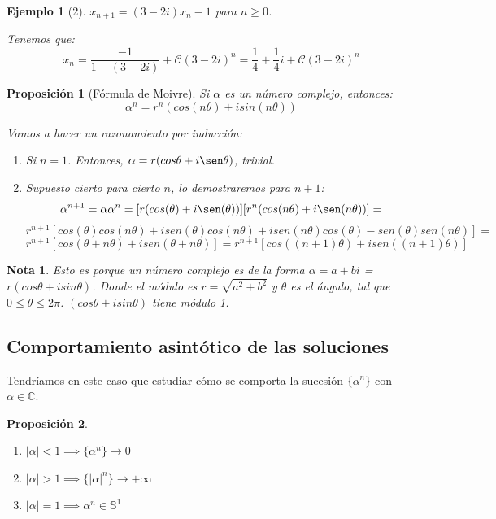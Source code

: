\documentclass[11pt, a4paper, titlepage]{article}
\makeatletter
\renewenvironment{proof}[1][\proofname] {\vspace{-15pt}\par\pushQED{\qed}\normalfont\topsep6\p@\@plus6\p@\relax\trivlist\item[\hskip\labelsep\it#1\@addpunct{.}]\ignorespaces}{\popQED\endtrivlist\@endpefalse}
\theoremstyle{theorem-style}
\newtheorem*{nprop}{Proposición}
\theoremstyle{definition-style}
\theoremstyle{remark-style}
\newtheorem*{nota}{Nota}
\theoremstyle{example-style}
\newtheorem*{ejemplo}{Ejemplo}
\newenvironment{nlist}
{\begin{enumerate}
\renewcommand\labelenumi{(\emph{\roman{enumi})}}}
{\end{enumerate}}
\makeatother
\begin{document}
\begin{ejemplo}[2]
	$x_{n+1}=(3-2i)x_n -1$ para $n\geq 0$. 
	\begin{proof}[Solución]
	Tenemos que:
	\[
	x_n = \frac{-1}{1-(3-2i)}+\mathcal{C}(3-2i)^n = \frac{1}{4} + \frac{1}{4}i + \mathcal{C}(3-2i)^n
	\]
\end{proof}
\end{ejemplo}

\begin{nprop}[Fórmula de Moivre]
	Si $\alpha$ es un número complejo, entonces:
	\[
	\alpha^n = r^n(cos(n\theta) + i sin(n\theta))
	\]
	\begin{proof}
	Vamos a hacer un razonamiento por inducción:
	\begin{enumerate}
	\item Si $n=1$. Entonces, $\alpha = r(cos\theta +i\sen\theta)$, trivial.
	\item Supuesto cierto para cierto $n$, lo demostraremos para $n+1$:
	\[
	\alpha^{n+1} = \alpha\alpha^n =  [r(cos(\theta) +i\sen(\theta))] [r^n(cos(n\theta) +i\sen(n\theta))]=
	\]
	\[
	r^{n+1}[cos(\theta) cos(n\theta) +i sen(\theta) cos(n\theta) + isen(n\theta) cos(\theta) - sen(\theta) sen(n\theta)] = \]
	\[r^{n+1}[cos(\theta+n\theta)+isen(\theta+n\theta)] = r^{n+1}[cos((n+1)\theta)+isen((n+1)\theta)]
	\]
\end{enumerate}
	
\end{proof}
\end{nprop}

\begin{nota}
	Esto es porque un número complejo es de la forma $\alpha = a+bi$ = $r(cos\theta + i sin\theta)$.
	Donde el módulo es $r=\sqrt{a^2 + b^2}$ y $\theta$ es el ángulo, tal que $0 \leq \theta \leq 2\pi$.
	$(cos\theta + i sin\theta)$ tiene módulo 1.
	
\end{nota}

\subsection{Comportamiento asintótico de las soluciones}
Tendríamos en este caso que estudiar cómo se comporta la sucesión $\{\alpha^n\}$ con $\alpha \in \mathbb{C}$.
\begin{nprop}\hfill
\begin{nlist}
	\item $|\alpha|< 1 \implies \{\alpha^n\}\to 0$
	\item $|\alpha|> 1 \implies \{|\alpha|^n\}\to +\infty$
	\item $|\alpha| = 1 \implies \alpha^n \in \mathbb{S}^1$
\end{nlist}
	
\end{nprop}
\end{document}
